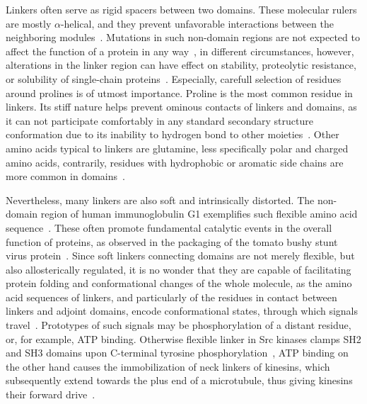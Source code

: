   Linkers often serve as rigid spacers between two domains.
  These molecular rulers are mostly $\alpha$-helical, and they prevent unfavorable
  interactions between the neighboring
  modules~\cite{george2002analysis, wriggers2005control}.
  Mutations in such non-domain regions are not expected to affect the function of a
  protein in any way~\cite{bottema1991missense}, in different circumstances, however,
  alterations in the linker region can have effect on stability, proteolytic resistance,
  or solubility of single-chain proteins~\cite{robinson1998optimizing}.
  Especially, carefull selection of residues around prolines is of utmost importance.
  Proline is the most common residue in linkers.
  Its stiff nature helps prevent ominous contacts of linkers and domains, as it can not
  participate comfortably in any standard secondary structure conformation due to its
  inability to hydrogen bond to other
  moieties~\cite{george2002analysis, wriggers2005control}.
  Other amino acids typical to linkers are glutamine, less specifically polar and charged
  amino acids, contrarily, residues with hydrophobic or aromatic side chains are more
  common in domains~\cite{brune2018proteome}.

  Nevertheless, many linkers are also soft and intrinsically distorted.
  The non-domain region of human immunoglobulin G1 exemplifies such flexible amino acid
  sequence~\cite{colman1976structure}.
  These often promote fundamental catalytic events in the overall function of proteins, as
  observed in the packaging of the tomato bushy stunt virus
  protein~\cite{winkler1977tomato}.
  Since soft linkers connecting domains are not merely flexible, but also allosterically
  regulated, it is no wonder that they are capable of facilitating protein folding and
  conformational changes of the whole molecule, as the amino acid sequences of linkers,
  and particularly of the residues in contact between linkers and adjoint domains,
  encode conformational states, through which signals
  travel~\cite{george2002analysis, ma2011dynamic}.
  Prototypes of such signals may be phosphorylation of a distant residue, or, for example,
  ATP binding.
  Otherwise flexible linker in Src kinases clamps SH2 and SH3 domains upon C-terminal
  tyrosine phosphorylation~\cite{young2001dynamic}, ATP binding on the other hand causes
  the immobilization of neck linkers of kinesins, which subsequently extend towards the
  plus end of a microtubule, thus giving kinesins their forward
  drive~\cite{rice1999structural, rosenfeld2001atp, khalil2008kinesin}.


